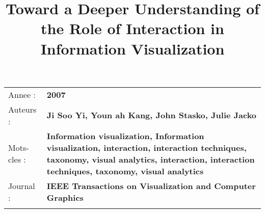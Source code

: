 \documentclass[10pt]{article}
\begin{document}
\title{Toward a Deeper Understanding of the Role of Interaction in Information Visualization}
\maketitle

\begin{longtable}[c]{@{}ll@{}}
\toprule\addlinespace

Annee : & \textbf{2007}
\\\addlinespace

Auteurs : & \textbf{Ji Soo Yi, Youn ah Kang, John Stasko, Julie Jacko}
\\\addlinespace

Mots-cles : & \textbf{Information visualization, Information visualization, interaction, interaction techniques, taxonomy, visual analytics, interaction, interaction techniques, taxonomy, visual analytics}
\\\addlinespace

Journal : & \textbf{IEEE Transactions on Visualization and Computer Graphics}
\\\addlinespace

\bottomrule
\end{longtable}
\end{document}
